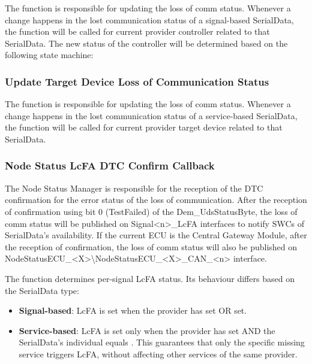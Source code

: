 The function  is responsible for updating the loss of comm status. Whenever a change happens in the lost communication status of a signal-based SerialData,
the function  will be called for current provider controller related to that SerialData. The new status of the controller will be determined based on the following state machine:

{  }

\subsubsection{Update Target Device Loss of Communication Status}

The function  is responsible for updating the loss of comm status. Whenever a change happens in the lost communication status of a service-based SerialData,
the function  will be called for current provider target device related to that SerialData.

{  }


\subsubsection{Node Status LcFA DTC Confirm Callback}
\label{subsec:NodeStatusLcFADTCCbk}

The Node Status Manager is responsible for the reception of the DTC confirmation for the error status of the loss of communication.
After the reception of confirmation using bit 0 (TestFailed) of the Dem\_UdsStatusByte, the loss of comm status will be published on Signal<n>\_LcFA interfaces to notify SWCs of SerialData's availability.
If the current ECU is the Central Gateway Module, after the reception of confirmation, the loss of comm status will also be published on NodeStatusECU\_<X>\textbackslash NodeStatusECU\_<X>\_CAN\_<n> interface.

The  function determines per-signal LcFA status. Its behaviour differs based on the SerialData type:
\begin{itemize}
    \item \textbf{Signal-based}: LcFA is set when the provider has  set OR  set.
    \item \textbf{Service-based}: LcFA is set only when the provider has  set AND the SerialData's individual  equals . This guarantees that only the specific missing service triggers LcFA, without affecting other services of the same provider.
\end{itemize}

